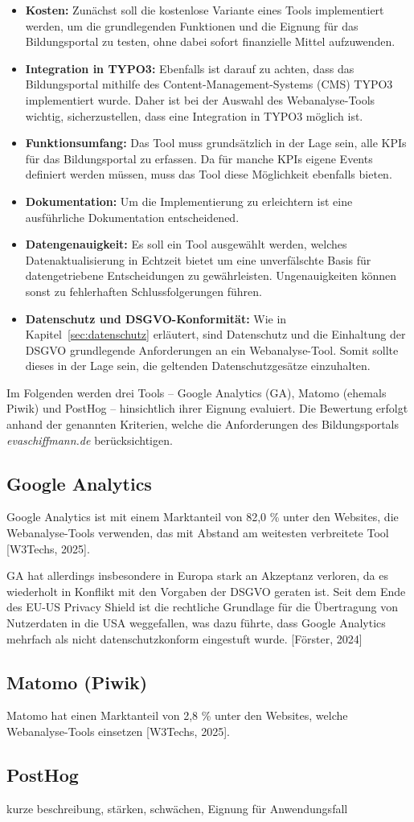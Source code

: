 \begin{itemize}
    \item \textbf{Kosten:} Zunächst soll die kostenlose Variante eines Tools implementiert werden, um die grundlegenden Funktionen und die Eignung für das Bildungsportal zu testen, ohne dabei sofort finanzielle Mittel aufzuwenden.
    \item \textbf{Integration in TYPO3:} Ebenfalls ist darauf zu achten, dass das Bildungsportal mithilfe des Content-Management-Systems (CMS) TYPO3 implementiert wurde. Daher ist bei der Auswahl des Webanalyse-Tools wichtig, sicherzustellen, dass eine Integration in TYPO3 möglich ist.
    \item \textbf{Funktionsumfang:} Das Tool muss grundsätzlich in der Lage sein, alle KPIs für das Bildungsportal zu erfassen. Da für manche KPIs eigene Events definiert werden müssen, muss das Tool diese Möglichkeit ebenfalls bieten. 
    \item \textbf{Dokumentation:} Um die Implementierung zu erleichtern ist eine ausführliche Dokumentation entscheidened.
    \item \textbf{Datengenauigkeit:} Es soll ein Tool ausgewählt werden, welches Datenaktualisierung in Echtzeit bietet um eine unverfälschte Basis für datengetriebene Entscheidungen zu gewährleisten. Ungenauigkeiten können sonst zu fehlerhaften Schlussfolgerungen führen.
    \item \textbf{Datenschutz und DSGVO-Konformität:} Wie in Kapitel~\ref{sec:datenschutz} erläutert, sind Datenschutz und die Einhaltung der DSGVO grundlegende Anforderungen an ein Webanalyse-Tool. Somit sollte dieses in der Lage sein, die geltenden Datenschutzgesätze einzuhalten.
\end{itemize}

Im Folgenden werden drei Tools – Google Analytics (GA), Matomo (ehemals Piwik) und PostHog – hinsichtlich ihrer Eignung evaluiert. Die Bewertung erfolgt anhand der genannten Kriterien, welche die Anforderungen des Bildungsportals \textit{evaschiffmann.de} berücksichtigen.

\subsection{Google Analytics}
Google Analytics ist mit einem Marktanteil von 82,0 \% unter den Websites, die Webanalyse-Tools verwenden, das mit Abstand am weitesten verbreitete Tool [W3Techs, 2025].

 


GA hat allerdings insbesondere in Europa stark an Akzeptanz verloren, da es wiederholt in Konflikt mit den Vorgaben der DSGVO geraten ist. Seit dem Ende des EU-US Privacy Shield ist die rechtliche Grundlage für die Übertragung von Nutzerdaten in die USA weggefallen, was dazu führte, dass Google Analytics mehrfach als nicht datenschutzkonform eingestuft wurde. [Förster, 2024]

\subsection{Matomo (Piwik)}
Matomo hat einen Marktanteil von 2,8 \% unter den Websites, welche Webanalyse-Tools einsetzen [W3Techs, 2025]. 
\subsection{PostHog}
kurze beschreibung, stärken, schwächen, Eignung für Anwendungsfall
